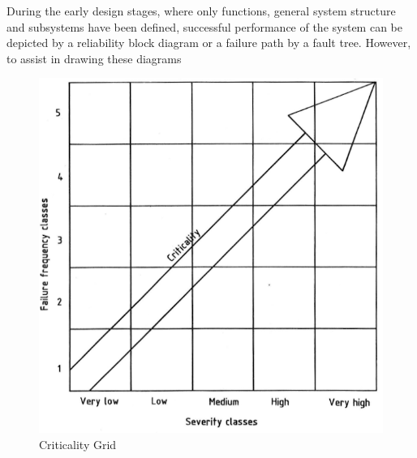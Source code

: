 \documentclass[./dissertation.tex]{subfiles}
\begin{document}
During the early design stages, where only functions, general system structure and subsystems have been defined, successful performance of the system can be depicted by a reliability block diagram or a failure path by a fault tree. However, to assist in drawing these diagrams

\begin{figure}
        \includegraphics[width=\linewidth]{subfiles/imgs/fmea_criticality_grid.png}
  \caption{Criticality Grid}
        \label{fig:criticality_grid}
\end{figure}
\end{document}
